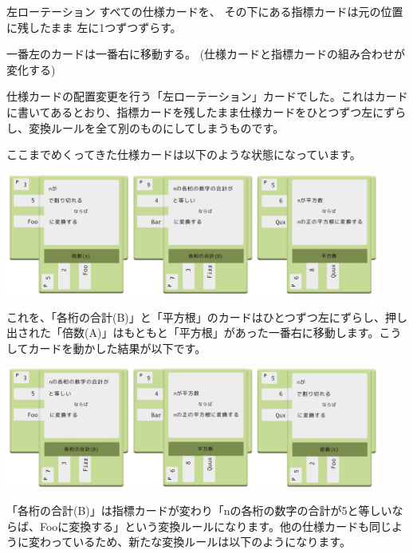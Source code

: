 \documentclass[index]{subfiles}
\begin{document}
\begin{itembox}[l]{左ローテーション}
すべての仕様カードを、 その下にある指標カードは元の位置に残したまま 左に1つずつずらす。

一番左のカードは一番右に移動する。 (仕様カードと指標カードの組み合わせが変化する)
\end{itembox}

仕様カードの配置変更を行う「左ローテーション」カードでした。これはカードに書いてあるとおり、指標カードを残したまま仕様カードをひとつずつ左にずらし、変換ルールを全て別のものにしてしまうものです。

ここまでめくってきた仕様カードは以下のような状態になっています。

\begin{center}
  \includegraphics[height=4cm]{image/205_replay_1_5.png}
\end{center}

これを、「各桁の合計(B)」と「平方根」のカードはひとつずつ左にずらし、押し出された「倍数(A)」はもともと「平方根」があった一番右に移動します。こうしてカードを動かした結果が以下です。

\begin{center}
  \includegraphics[height=4cm]{image/206_replay_1_6.png}
\end{center}

「各桁の合計(B)」は指標カードが変わり「nの各桁の数字の合計が5と等しいならば、Fooに変換する」という変換ルールになります。他の仕様カードも同じように変わっているため、新たな変換ルールは以下のようになります。
\end{document}
